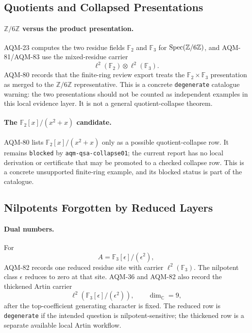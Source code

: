 \subsection{Quotients and Collapsed Presentations}

\paragraph{\(\mathbb Z/6\mathbb Z\) versus the product presentation.}
AQM-23 computes the two residue fields \(\mathbb F_2\) and
\(\mathbb F_3\) for \(\operatorname{Spec}(\mathbb Z/6\mathbb Z)\), and AQM-81/AQM-83 use
the mixed-residue carrier
\[
  \ell^2(\mathbb F_2)\otimes\ell^2(\mathbb F_3).
\]
AQM-80 records that the finite-ring review export treats the
\(\mathbb F_2\times\mathbb F_3\) presentation as merged to the
\(\mathbb Z/6\mathbb Z\) representative.  This is a concrete
\texttt{degenerate} catalogue warning: the two presentations should not be
counted as independent examples in this local evidence layer.  It is not a
general quotient-collapse theorem.

\paragraph{The \(\mathbb F_2[x]/(x^2+x)\) candidate.}
AQM-80 lists \(\mathbb F_2[x]/(x^2+x)\) only as a possible
quotient-collapse row.  It remains \texttt{blocked} by
\texttt{aqm-qsa-collapse01}; the current report has no local derivation or
certificate that may be promoted to a checked collapse row.  This is a
concrete unsupported finite-ring example, and its blocked status is part of
the catalogue.

\subsection{Nilpotents Forgotten by Reduced Layers}

\paragraph{Dual numbers.}
For
\[
  A=\mathbb F_3[\epsilon]/(\epsilon^2),
\]
AQM-82 records one reduced residue site with carrier \(\ell^2(\mathbb F_3)\).
The nilpotent class \(\epsilon\) reduces to zero at that site.  AQM-36 and
AQM-82 also record the thickened Artin carrier
\[
  \ell^2(\mathbb F_3[\epsilon]/(\epsilon^2)),
  \qquad \dim_{\mathbb C}=9,
\]
after the top-coefficient generating character is fixed.  The reduced row is
\texttt{degenerate} if the intended question is nilpotent-sensitive; the
thickened row is a separate available local Artin workflow.

